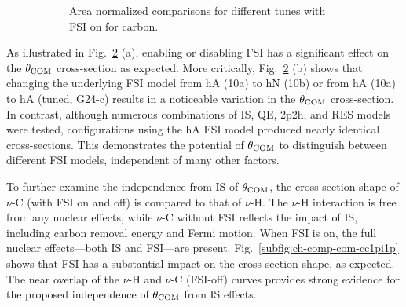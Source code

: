 \begin{figure}[ht!]
\begin{subfigure}[ht!]{\dbfigwid\textwidth}
          \caption{Area normalized comparisons for different tunes with FSI on for carbon. }
          \label{subfig:fsi-comp-gt}
     \end{subfigure}
     \caption{ }
     \label{fig:fsi-comp}
     \end{figure}

     As illustrated in Fig.~\ref{fig:fsi-comp} (a), enabling or disabling FSI has a significant effect on the $\theta_{\textrm{COM}}$ cross-section as expected.
     More critically, Fig.~\ref{fig:fsi-comp} (b) shows that changing the underlying FSI model from hA (10a) to hN (10b) or from hA (10a) to hA (tuned, G24-c) results in a noticeable variation in the $\theta_{\textrm{COM}}$ cross-section. 
     In contrast, although numerous combinations of IS, QE, 2p2h, and RES models were tested, configurations using the hA FSI model produced nearly identical cross-sections.
     This demonstrates the potential of $\theta_{\textrm{COM}}$ to distinguish between different FSI models, independent of many other factors.


     To further examine the independence from IS of $\theta_{\textrm{COM}}$, the cross-section shape of $\nu$-C (with FSI on and off) is compared to that of $\nu$-H. 
     The $\nu$-H interaction is free from any nuclear effects, while $\nu$-C without FSI reflects the impact of IS, including carbon removal energy and Fermi motion. 
     When FSI is on, the full nuclear effects—both IS and FSI—are present. 
     Fig.~\ref{subfig:ch-comp-com-cc1pi1p} shows that FSI has a substantial impact on the cross-section shape, as expected. 
     The near overlap of the $\nu$-H and $\nu$-C (FSI-off) curves provides strong evidence for the proposed independence of $\theta_{\textrm{COM}}$ from IS effects.

